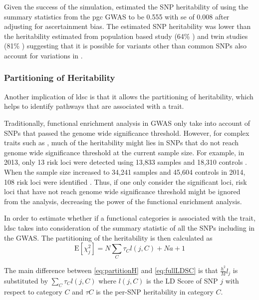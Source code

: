 	Given the success of the simulation, \citet{Bulik-Sullivan2015} estimated the \gls{SNP} heritability of  using the summary statistics from the \gls{pgc}  \gls{GWAS} \citep{Ripke2014} to be 0.555 with \gls{se} of 0.008 after adjusting for ascertainment bias.
	The estimated \gls{SNP} heritability was lower than the heritability estimated from population based study (64\% \citep{Lichtenstein2009}) and twin studies (81\% \citep{Sullivan2003}) suggesting that it is possible for variants other than common \glspl{SNP} also account for variations in .
	
	\subsubsection{Partitioning of Heritability}
	Another implication of \gls{ldsc} is that it allows the partitioning of heritability, which helps to identify pathways that are associated with a trait.
	
	Traditionally, functional enrichment analysis in \gls{GWAS} only take into account of \glspl{SNP} that passed the genome wide significance threshold. 
	However, for complex traits such as , much of the heritability might lies in \glspl{SNP} that do not reach genome wide significance threshold at the current sample size.
	For example, in 2013, only 13 risk loci were detected using 13,833  samples and 18,310 controls \citep{Ripke2013}. 
	When the sample size increased to 34,241  samples and 45,604 controls in 2014, 108 risk loci were identified \citep{Ripke2014}. 
	Thus, if one only consider the significant loci, risk loci that have not reach genome wide significance threshold might be ignored from the analysis, decreasing the power of the functional enrichment analysis.

	In order to estimate whether if a functional categories is associated with the trait, \gls{ldsc} takes into consideration of the summary statistic of all the \glspl{SNP} including in the \gls{GWAS}.
	The partitioning of the heritability is then calculated as 
	\begin{equation}
	\mathrm{E}[\chi^2_j] = N\sum_C\tau_Cl(j,C)+Na+1
	\label{eq:partitionH}
	\end{equation}
	
	The main difference between \cref{eq:partitionH} and \cref{eq:fullLDSC} is that $\frac{h^2}{M}l_j$ is substituted by $\sum_C\tau_Cl(j,C)$ where $l(j,C)$ is the \gls{LD} Score of \gls{SNP} $j$ with respect to category $C$ and $\tau C$ is the per-\gls{SNP} heritability in category $C$.
	
